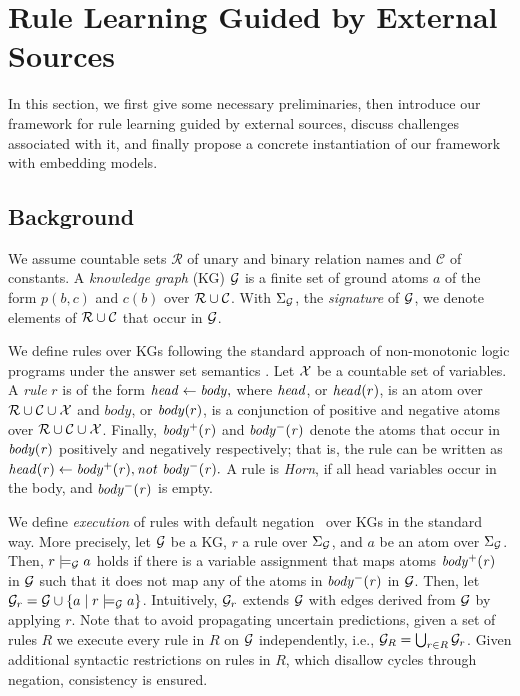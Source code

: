 

\section{Rule Learning Guided by External Sources}

In this section, we first give some necessary preliminaries, 
then introduce our framework for rule learning guided by external sources,
discuss challenges associated with it, and finally propose a concrete instantiation of our framework with embedding models.

\subsection{Background}

We assume countable sets $\mathcal{R}$ of unary and binary relation names and $\mathcal{C}$  of constants. 
A \emph{knowledge graph} (KG) $\mathcal{G}$ is a finite set of ground atoms $a$ of the form
$p(b,c)$ and $c(b)$ over $\mathcal{R}\cup\mathcal{C}$.
With $\Sigma_{\mathcal{G}}$, the \emph{signature} of $\mathcal{G}$, we denote elements of $\mathcal{R}\cup\mathcal{C}$ that occur in $\mathcal{G}$.


We define rules over KGs following the standard approach of non-monotonic logic programs under the answer set semantics \cite{GL1988}.
Let $\mathcal{X}$ be a countable set of variables.
A \emph{rule} $r$ is 
of the form
$
\mathit{head \leftarrow body},
$
where $\mathit{head}$, or $\mathit{head}(r)$, is an atom 
over $\mathcal{R} \cup \mathcal{C} \cup \mathcal{X}$ 
and $body$, or $\mathit{body}(r)$, is a conjunction of positive and negative atoms 
over $\mathcal{R}\cup\mathcal{C}\cup\mathcal{X}$.
Finally, 
$\mathit{body^+(r)}$ and $\mathit{body^-(r)}$ denote the atoms that occur in $\mathit{body(r)}$ positively and negatively respectively; that is, the rule can be written as
$
\mi{head(r) \leftarrow body^+(r), not\ body^-(r)}.
$
A rule is \emph{Horn}, if all head variables occur in the body,
and $\mathit{body^-(r)}$ is empty.


We define \emph{execution} of rules with default negation~\cite{GL1988} over KGs in the standard way.
More precisely, let $\mathcal{G}$ be a KG, $r$ a rule over $\Sigma_\mathcal{G}$, 
and $a$ be an atom over $\Sigma_\mathcal{G}$.
Then, $r \models_\mathcal{G} a$ holds if there is a variable assignment that maps atoms $\mathit{body^+(r)}$ in $\mathcal{G}$ such that it does not map any of the atoms in $\mathit{body^-(r)}$ in $\mathcal{G}$. 
Then, let $\mathcal{G}_r = \mathcal{G} \cup \{a \mid r \models_\mathcal{G} a\}$. 
Intuitively, $\mathcal{G}_r$ extends $\mathcal{G}$ with edges derived from $\mathcal{G}$ by applying $r$.  Note that to avoid propagating uncertain predictions, given a set of rules $R$ we execute every rule in $R$ on $\mathcal{G}$ independently, i.e., $\mathcal{G}_R=\bigcup_{r\in R}\mathcal{G}_r$. Given additional syntactic restrictions on rules in $R$, which disallow cycles through negation, consistency is ensured.

